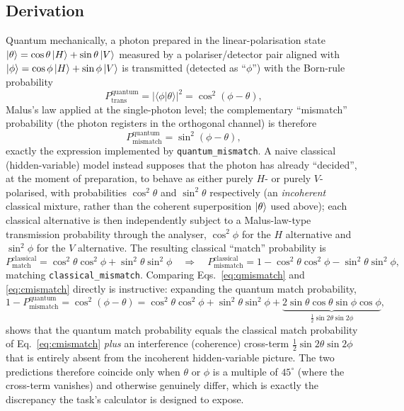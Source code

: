 \documentclass[11pt]{article}
\begin{document}
\subsection{Derivation}
Quantum mechanically, a photon prepared in the linear-polarisation state $\ket{\theta}=\cos\theta\ket{H}+\sin\theta\ket{V}$ measured by a polariser/detector pair aligned with $\ket{\phi}=\cos\phi\ket{H}+\sin\phi\ket{V}$ is transmitted (detected as ``$\phi$'') with the Born-rule probability
\begin{equation}
P_\text{trans}^\text{quantum} = |\langle\phi|\theta\rangle|^2 = \cos^2(\phi-\theta),
\end{equation}
Malus's law applied at the single-photon level; the complementary ``mismatch'' probability (the photon registers in the orthogonal channel) is therefore
\begin{equation}
P_\text{mismatch}^\text{quantum} = \sin^2(\phi-\theta), \label{eq:qmismatch}
\end{equation}
exactly the expression implemented by \texttt{quantum\_mismatch}. A naive classical (hidden-variable) model instead supposes that the photon has already ``decided'', at the moment of preparation, to behave as either purely $H$- or purely $V$-polarised, with probabilities $\cos^2\theta$ and $\sin^2\theta$ respectively (an \emph{incoherent} classical mixture, rather than the coherent superposition $\ket\theta$ used above); each classical alternative is then independently subject to a Malus-law-type transmission probability through the analyser, $\cos^2\phi$ for the $H$ alternative and $\sin^2\phi$ for the $V$ alternative. The resulting classical ``match'' probability is
\begin{equation}
P_\text{match}^\text{classical} = \cos^2\theta\cos^2\phi+\sin^2\theta\sin^2\phi
\quad\Longrightarrow\quad
P_\text{mismatch}^\text{classical} = 1-\cos^2\theta\cos^2\phi-\sin^2\theta\sin^2\phi, \label{eq:cmismatch}
\end{equation}
matching \texttt{classical\_mismatch}. Comparing Eqs.~\eqref{eq:qmismatch} and \eqref{eq:cmismatch} directly is instructive: expanding the quantum match probability,
\begin{equation}
1-P_\text{mismatch}^\text{quantum} = \cos^2(\phi-\theta) = \cos^2\theta\cos^2\phi + \sin^2\theta\sin^2\phi + \underbrace{2\sin\theta\cos\theta\sin\phi\cos\phi}_{\tfrac12\sin2\theta\sin2\phi},
\end{equation}
shows that the quantum match probability equals the classical match probability of Eq.~\eqref{eq:cmismatch} \emph{plus} an interference (coherence) cross-term $\tfrac12\sin2\theta\sin2\phi$ that is entirely absent from the incoherent hidden-variable picture. The two predictions therefore coincide only when $\theta$ or $\phi$ is a multiple of $45^\circ$ (where the cross-term vanishes) and otherwise genuinely differ, which is exactly the discrepancy the task's calculator is designed to expose.
\end{document}
